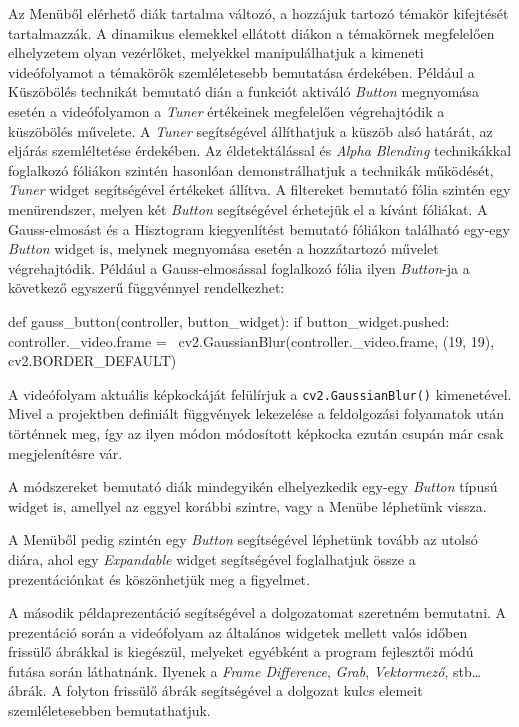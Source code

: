 Az Menüből elérhető diák tartalma változó, a hozzájuk tartozó témakör kifejtését tartalmazzák. A dinamikus elemekkel ellátott diákon a témakörnek megfelelően elhelyzetem olyan vezérlőket, melyekkel manipulálhatjuk a kimeneti videófolyamot a témakörök szemléletesebb bemutatása érdekében.
Például a Küszöbölés technikát bemutató dián a funkciót aktiváló \textit{Button} megnyomása esetén a videófolyamon a \textit{Tuner} értékeinek megfelelően végrehajtódik a küszöbölés művelete. A \textit{Tuner} segítségével állíthatjuk a küszöb alsó határát, az eljárás szemléltetése érdekében.
Az éldetektálással és \textit{Alpha Blending} technikákkal foglalkozó fóliákon szintén hasonlóan demonstrálhatjuk a technikák működését, \textit{Tuner} widget segítségével értékeket állítva.
A filtereket bemutató fólia szintén egy menürendszer, melyen két \textit{Button} segítségével érhetejük el a kívánt fóliákat. A Gauss-elmosást és a Hisztogram kiegyenlítést bemutató fóliákon található egy-egy \textit{Button} widget is, melynek megnyomása esetén a hozzátartozó művelet végrehajtódik. Például a Gauss-elmosással foglalkozó fólia ilyen \textit{Button}-ja a következő egyszerű függvénnyel rendelkezhet:
\begin{python}
def gauss_button(controller, button_widget):
    if button_widget.pushed:
        controller._video.frame = \
        		cv2.GaussianBlur(controller._video.frame,
					(19, 19),
					cv2.BORDER_DEFAULT)
\end{python}
A videófolyam aktuális képkockáját felülírjuk a \texttt{cv2.GaussianBlur()} kimenetével. Mivel a projektben definiált függvények lekezelése a feldolgozási folyamatok után történnek meg, így az ilyen módon módosított képkocka ezután csupán már csak megjelenítésre vár.

A módszereket bemutató diák mindegyikén elhelyezkedik egy-egy \textit{Button} típusú widget is, amellyel az eggyel korábbi szintre, vagy a Menübe léphetünk vissza.

A Menüből pedig szintén egy \textit{Button} segítségével léphetünk tovább az utolsó diára, ahol egy \textit{Expandable} widget segítségével foglalhatjuk össze a prezentációnkat és köszönhetjük meg a figyelmet.


A második példaprezentáció segítségével a dolgozatomat szeretném bemutatni.
A prezentáció során a videófolyam az általános widgetek mellett valós időben frissülő ábrákkal is kiegészül, melyeket egyébként a program fejlesztői módú futása során láthatnánk. Ilyenek a \textit{Frame Difference}, \textit{Grab}, \textit{Vektormező}, stb\ldots ábrák. A folyton frissülő ábrák segítségével a dolgozat kulcs elemeit szemléletesebben bemutathatjuk.

